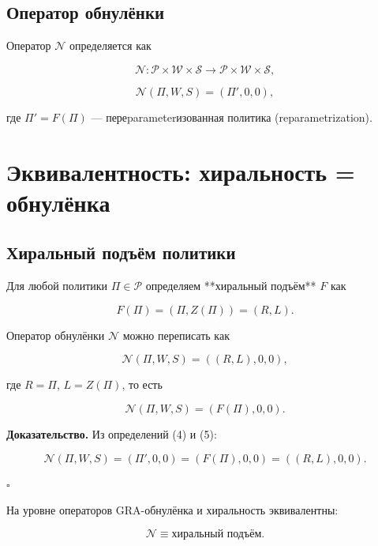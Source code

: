 \documentclass[11pt,a4paper]{article}
\begin{document}
\subsection{Оператор обнулёнки}

\begin{definition}
Оператор \(\mathcal{N}\) определяется как

\[
\mathcal{N} : \mathcal{P} \times \mathcal{W} \times \mathcal{S}
\to
\mathcal{P} \times \mathcal{W} \times \mathcal{S},
\]

\[
\mathcal{N}(\Pi, W, S) = (\Pi', 0, 0),
\tag{4}
\]

где \(\Pi' = F(\Pi)\) — переparameterизованная политика (reparametrization).
\end{definition}

\section{Эквивалентность: хиральность = обнулёнка}

\subsection{Хиральный подъём политики}

\begin{definition}
Для любой политики \(\Pi \in \mathcal{P}\) определяем **хиральный подъём** \(F\) как

\[
F(\Pi) = (\Pi, Z(\Pi)) = (R, L).
\tag{5}
\]
\end{definition}

\begin{theorem}
Оператор обнулёнки \(\mathcal{N}\) можно переписать как

\[
\mathcal{N}(\Pi, W, S) = ((R, L), 0, 0),
\tag{6}
\]

где \(R = \Pi\), \(L = Z(\Pi)\), то есть

\[
\mathcal{N}(\Pi, W, S) = (F(\Pi), 0, 0).
\tag{7}
\]
\end{theorem}

\textbf{Доказательство.}
Из определений (4) и (5):

\[
\mathcal{N}(\Pi, W, S) = (\Pi', 0, 0)
= (F(\Pi), 0, 0)
= ((R, L), 0, 0).
\]

\(\square\)

\begin{corollary}[Обнулёнка = хиральность]
На уровне операторов GRA-обнулёнка и хиральность эквивалентны:

\[
\mathcal{N} \equiv \text{хиральный подъём}.
\tag{8}
\]
\end{corollary}
\end{document}
